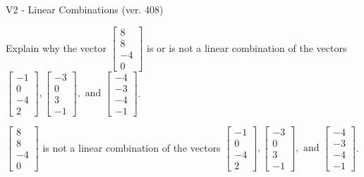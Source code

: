 \begin{exercise}
  \begin{exerciseTitle}V2 - Linear Combinations (ver. 408)\end{exerciseTitle}
  \begin{exerciseStatement}
    Explain why the vector \(\left[\begin{array}{c}
8 \\
8 \\
-4 \\
0
\end{array}\right]\)  is or is not a linear 
	combination of the vectors \(\left[\begin{array}{c}
-1 \\
0 \\
-4 \\
2
\end{array}\right] , \left[\begin{array}{c}
-3 \\
0 \\
3 \\
-1
\end{array}\right] , \text{ and } \left[\begin{array}{c}
-4 \\
-3 \\
-4 \\
-1
\end{array}\right]\).
	


  \end{exerciseStatement}
  \begin{exerciseAnswer}
   \(\left[\begin{array}{c}
8 \\
8 \\
-4 \\
0
\end{array}\right]\) 
  	 is not  
	a linear combination of the vectors \(\left[\begin{array}{c}
-1 \\
0 \\
-4 \\
2
\end{array}\right] , \left[\begin{array}{c}
-3 \\
0 \\
3 \\
-1
\end{array}\right] , \text{ and } \left[\begin{array}{c}
-4 \\
-3 \\
-4 \\
-1
\end{array}\right]\).

	
  


  \end{exerciseAnswer}
\end{exercise}